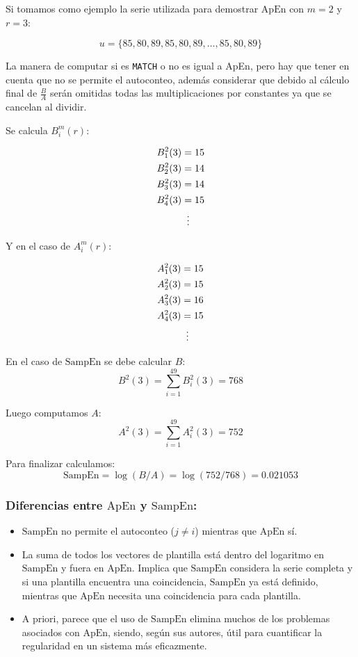 \documentclass[a4paper,12pt]{article}
\begin{document}
		Si tomamos como ejemplo la serie utilizada para demostrar $\textrm{ApEn}$ con $m=2$ y $r=3$:
		
		$$u = \{85, 80, 89, 85, 80, 89, \dots, 85, 80, 89\}$$
		
		La manera de computar si es \texttt{MATCH} o no es igual a \textrm{ApEn}, pero hay que tener en cuenta que no se permite el autoconteo, además considerar que debido al cálculo final de $\frac{B}{A}$ serán omitidas todas las multiplicaciones por constantes ya que se cancelan al dividir.
		
		Se calcula $B_i^m(r)$:
		
		\begin{align*}
			B_1^2(3) & =15             \\
			B_2^2(3) & =14             \\
			B_3^2(3) & =14             \\
			B_4^2(3) & =15             \\
			         & \vdotswithin{=} \\
		\end{align*}
		
		Y en el caso de $A_i^m(r)$:
		
		\begin{align*}
			A_1^2(3) & =15             \\
			A_2^2(3) & =15             \\
			A_3^2(3) & =16             \\
			A_4^2(3) & =15             \\
			         & \vdotswithin{=} \\
		\end{align*}
		
		En el caso de $\textrm{SampEn}$ se debe calcular $B$:
		$$B^2(3)= \sum_{i=1}^{49} B_i^2(3) = 768$$
		
		Luego computamos $A$:
		$$A^2(3)= \sum_{i=1}^{49} A_i^2(3) = 752$$
		
		Para finalizar calculamos:
		$$\textrm{SampEn} = \log(B/A) = \log(752/768) = 0.021053$$
		
		\subsubsection{Diferencias entre $\textrm{ApEn}$ y $\textrm{SampEn}$:}
		\begin{itemize}[noitemsep, topsep=2pt]
			\item $\textrm{SampEn}$ no permite el autoconteo ($j \neq i$) mientras que $\textrm{ApEn}$ sí. 
			\item La suma de todos los vectores de plantilla está dentro del logaritmo en $\textrm{SampEn}$ y fuera en $\textrm{ApEn}$. Implica que $\textrm{SampEn}$ considera la serie completa y si una plantilla encuentra una coincidencia, $\textrm{SampEn}$ ya está definido, mientras que $\textrm{ApEn}$ necesita una coincidencia para cada plantilla. 
			\item A priori, parece que el uso de $\textrm{SampEn}$ elimina muchos de los problemas asociados con $\textrm{ApEn}$, siendo, según sus autores, útil para cuantificar la regularidad en un sistema más eficazmente.
		\end{itemize}
		
\end{document}
